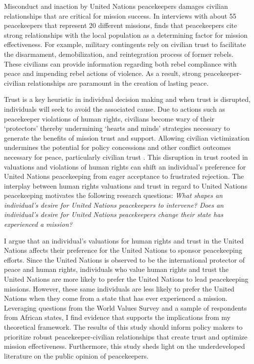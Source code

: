 \documentclass[12pt]{article}
\newcommand{\UN}[1]{United Nations}
\begin{document}
Misconduct and inaction by United Nations peacekeepers damages civilian relationships that are critical for mission success. In interviews with about 55 peacekeepers that represent 20 different missions, \cite{furnari2015relationships} finds that peacekeepers cite strong relationships with the local population as a determining factor for mission effectiveness. For example, military contingents rely on civilian trust to facilitate the disarmament, demobilization, and reintegration process of former rebels. These civilians can provide information regarding both rebel compliance with peace and impending rebel actions of violence. As a result, strong peacekeeper-civilian relationships are paramount in the creation of lasting peace. 

Trust is a key heuristic in individual decision making \citep{carlin2013politics} and when trust is disrupted, individuals will seek to avoid the associated cause. Due to actions such as peacekeeper violations of human rights, civilians become wary of their `protectors' thereby undermining `hearts and minds' strategies necessary to generate the benefits of mission trust and support. Allowing civilian victimization undermines the potential for policy concessions and other conflict outcomes necessary for peace, particularly civilian trust \citep[Ex.][]{de2016civil,ottmann2017rebel,krcmaric2018varieties}. This disruption in trust rooted in valuations and violations of human rights can shift an individual's preference for United Nations peacekeeping from eager acceptance to frustrated rejection. The interplay between human rights valuations and trust in regard to United Nations peacekeeping motivates the following research questions: \textit{What shapes an individual's desire for United Nations peacekeepers to intervene? Does an individual's desire for United Nations peacekeepers change their state has experienced a mission?} 

I argue that an individual's valuations for human rights and trust in the United Nations affects their preference for the United Nations to sponsor peacekeeping efforts. Since the United Nations is observed to be the international protector of peace and human rights, individuals who value human rights and trust the \UN{} are more likely to prefer the \UN{} to lead peacekeeping missions. However, these same individuals are less likely to prefer the \UN{} when they come from a state that has ever experienced a mission. Leveraging questions from the World Values Survey and a sample of respondents from African states, I find evidence that supports the implications from my theoretical framework. The results of this study should inform policy makers to prioritize robust peacekeeper-civilian relationships that create trust and optimize mission effectiveness. Furthermore, this study sheds light on the underdeveloped literature on the public opinion of peacekeepers. 
\end{document}
